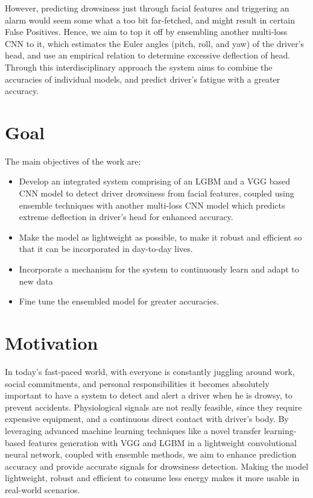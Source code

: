 \documentclass[a4paper,12pt]{report}
\begin{document}
However, predicting drowsiness just through facial features and triggering an alarm would seem some what a too bit far-fetched, and might result in certain False Positives. Hence, we aim to top it off by ensembling another multi-loss CNN to it, which estimates the Euler angles (pitch, roll, and yaw) of the driver's head, and use an empirical relation to determine excessive deflection of head. Through this interdisciplinary approach the system aims to combine the accuracies of individual models, and predict driver's fatigue with a greater accuracy.



\section{Goal}
The main objectives of the work are:
\begin{itemize}

    \item Develop an integrated system comprising of an LGBM and a VGG based CNN model to detect driver drowsiness from facial features, coupled using ensemble techniques with another multi-loss CNN model which predicts extreme deflection in driver's head for enhanced accuracy.

    \item Make the model as lightweight as possible, to make it robust and efficient so that it can be incorporated in day-to-day lives.

    \item Incorporate a mechanism for the system to continuously learn and adapt to new data

    \item Fine tune the ensembled model for greater accuracies.

\end{itemize}

\section{Motivation}
In today's fast-paced world, with everyone is constantly juggling  around work, social commitments, and personal responsibilities it becomes absolutely important to have a system to detect and alert a driver when he is drowsy, to prevent accidents. Physiological signals are not really feasible, since they require expensive equipment, and a continuous direct contact with driver's body. By leveraging advanced machine learning techniques like a novel transfer
learning-based features generation with VGG and LGBM in a lightweight convolutional neural network, coupled with ensemble methods, we aim to enhance prediction accuracy and provide accurate signals for drowsiness detection. Making the model lightweight, robust and efficient to consume less energy makes it more usable in real-world scenarios.
\end{document}
